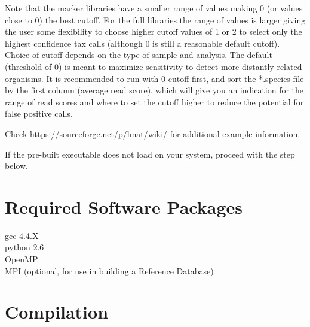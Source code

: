 \documentclass[11pt]{article}
\begin{document}
Note that the marker libraries have a smaller range of values making 0 (or values close to 0) the best cutoff.  For the full libraries the range of values is larger giving the user some flexibility to choose higher cutoff values of 1 or 2 to select only the highest confidence tax calls (although 0 is still a reasonable default cutoff).  Choice of cutoff depends on the type of sample and analysis. The default (threshold of 0) is meant to maximize sensitivity to detect more distantly related organisms.  It is recommended to run with 0 cutoff first, and sort the *.species file by the first column (average read score), which will give you an indication for the range of read scores and where to set the cutoff higher to reduce the potential for false positive calls.

Check https://sourceforge.net/p/lmat/wiki/ for additional example information.

If the pre-built executable does not load on your system, proceed with the  step below.

\section{Required Software Packages}

gcc 4.4.X\\
python 2.6\\
OpenMP\\
MPI (optional, for use in building a Reference Database)

\section{Compilation}
\label{sec:compile}
\end{document}
